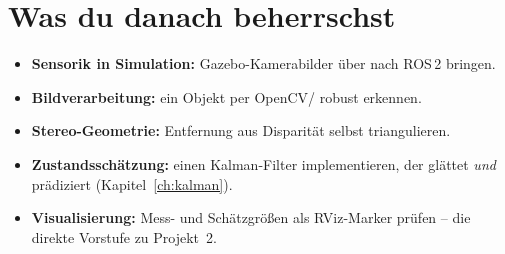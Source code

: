 \section{Was du danach beherrschst}
\begin{itemize}
\item \textbf{Sensorik in Simulation:} Gazebo-Kamerabilder über 
  nach ROS\,2 bringen.
\item \textbf{Bildverarbeitung:} ein Objekt per OpenCV/ robust
  erkennen.
\item \textbf{Stereo-Geometrie:} Entfernung aus Disparität selbst triangulieren.
\item \textbf{Zustandsschätzung:} einen Kalman-Filter implementieren, der glättet
  \emph{und} prädiziert (Kapitel~\ref{ch:kalman}).
\item \textbf{Visualisierung:} Mess- und Schätzgrößen als RViz-Marker prüfen --
  die direkte Vorstufe zu Projekt~2.
\end{itemize}
